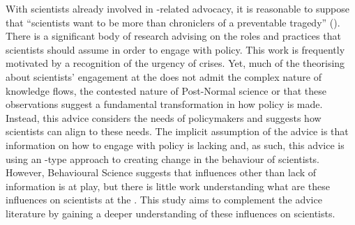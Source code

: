 With scientists already involved in \CAN-related advocacy, it is reasonable to suppose that ``scientists want to be more than chroniclers of a preventable tragedy'' (\cite{WyattGT2024}). There is a significant body of research advising on the roles and practices that scientists should assume in order to engage with policy. This work is frequently motivated by a recognition of the urgency of \CAN{} crises. Yet, much of the theorising about scientists' engagement at the \SPI{} does not admit the complex nature of knowledge flows, the contested nature of Post-Normal \CAN{} science or that these observations suggest a fundamental transformation in how \CAN{} policy is made. Instead, this advice considers the needs of policymakers and suggests how scientists can align to these needs. %
The implicit assumption of the advice is that information on how to engage with policy is lacking and, as such, this advice is using an \IDM-type approach to creating change in the behaviour of scientists. However, Behavioural Science suggests that influences other than lack of information is at play, but there is little work understanding what are these influences on scientists at the \CAN{} \SPI. This study aims to complement the advice literature by gaining a deeper understanding of these influences on scientists.
%

